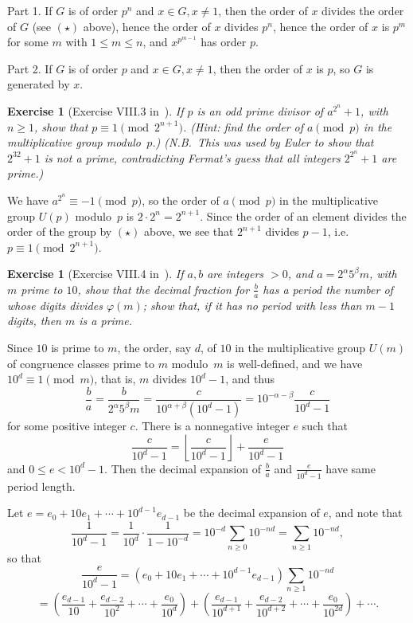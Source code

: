 \documentclass[12pt,letterpaper]{article}
\newtheorem{exer}[thm]{Exercise}
\theoremstyle{definition}
\begin{document}
Part 1. If $G$ is of order $p^n$ and $x\in G, x\ne 1$, then the order of $x$ divides the order of $G$ (see $(\star)$ above), hence the order of $x$ divides $p^n$, hence the order of $x$ is $p^m$ for some $m$ with $1\le m\le n$, and $x^{p^{m-1}}$ has order $p$. 

Part 2. If $G$ is of order $p$ and $x\in G, x\ne1$, then the order of $x$ is $p$, so $G$ is generated by $x$. 

\begin{exer}[Exercise VIII.3 in~\cite{weil1979}]
If $p$ is an odd prime divisor of $a^{2^n}+1$, with $n\ge 1$, show that $p\equiv 1\pmod{2^{n+1}}$. (Hint: find the order of $a \pmod p$ in the multiplicative group modulo~$p$.) (N.B.\ This was used by Euler to show that $2^{32}+1$ is not a prime, contradicting Fermat's guess that all integers $2^{2^n}+1$ are prime.) 
\end{exer}

We have $a^{2^n} \equiv -1 \pmod{p}$, so the order of $a \pmod p$ in the multiplicative group $U(p)$ modulo~$p$ is $2\cdot2^n = 2^{n+1}$. Since the order of an element divides the order of the group by $(\star)$ above, we see that $2^{n+1}$ divides $p-1$, i.e. $p\equiv 1\pmod{2^{n+1}}$. 

\begin{exer}[Exercise VIII.4 in~\cite{weil1979}]
If $a,b$ are integers $>0$, and $a=2^{\alpha}5^{\beta}m$, with $m$ prime to $10$, show that the decimal fraction for $\frac{b}{a}$ has a period the number of whose digits divides $\varphi(m)$; show that, if it has no period with less than $m-1$ digits, then $m$ is a prime.
\end{exer}

Since $10$ is prime to $m$, the order, say $d$, of $10$ in the multiplicative group $U(m)$ of congruence classes prime to $m$ modulo~$m$ is well-defined, and we have $10^d\equiv1\pmod m$, that is, $m$ divides $10^d-1$, and thus 
$$
\frac{b}{a}=\frac{b}{2^{\alpha}5^{\beta}m}=\frac{c}{10^{\alpha+\beta}(10^d-1)}=10^{-\alpha-\beta}\frac{c}{10^d-1}
$$ 
for some positive integer $c$. There is a nonnegative integer $e$ such that 
$$
\frac{c}{10^d-1}=\left\lfloor\frac{c}{10^d-1}\right\rfloor+\frac{e}{10^d-1}
$$ 
and $0\le e<10^d-1$. Then the decimal expansion of $\frac{b}{a}$ and $\frac{e}{10^d-1}$ have same period length. 

Let $e=e_0+10e_1+\cdots+10^{d-1}e_{d-1}$ be the decimal expansion of $e$, and note that 
$$
\frac{1}{10^d-1}=\frac{1}{10^d} \cdot \frac{1}{1-10^{-d}} = 10^{-d} \sum_{n\ge0} 10^{-nd} = \sum_{n\ge1} 10^{-nd},
$$ 
so that 
$$
\frac{e}{10^d-1}=(e_0+10e_1+\cdots+10^{d-1}e_{d-1}) \sum_{n\ge1} 10^{-nd}
$$ 
$$
= \left(\frac{e_{d-1}}{10} + \frac{e_{d-2}}{10^2} + \cdots + \frac{e_0}{10^d}\right) + \left(\frac{e_{d-1}}{10^{d+1}} + \frac{e_{d-2}}{10^{d+2}} + \cdots + \frac{e_0}{10^{2d}}\right) + \cdots.
$$ 
\end{document}
